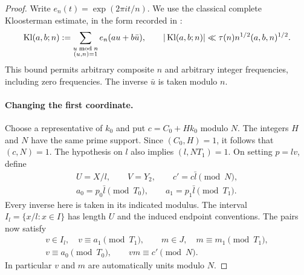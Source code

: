 \begin{proof}
Write $e_n(t)=\exp(2\pi i t/n)$.  We use the classical complete
Kloosterman estimate, in the form recorded in
\cite[Lemma~7.1]{Lichtman2022}:
\begin{equation}
\label{eq:hyperbola-weil}
 \operatorname{Kl}(a,b;n):=\sum_{\substack{u\bmod n\\(u,n)=1}}
                  e_n(au+b\bar u),
 \qquad
 |\operatorname{Kl}(a,b;n)|\ll\tau(n)n^{1/2}(a,b,n)^{1/2}.
\end{equation}
This bound permits arbitrary composite $n$ and arbitrary integer
frequencies, including zero frequencies.  The inverse $\bar u$ is
taken modulo $n$.

\paragraph{Changing the first coordinate.}
Choose a representative of $k_0$ and put $c=C_0+Hk_0$ modulo $N$.
The integers $H$ and $N$ have the same prime support.  Since
$(C_0,H)=1$, it follows that $(c,N)=1$.  The hypothesis on $l$ also
implies $(l,NT_1)=1$.  On setting $p=lv$, define
\[
 \begin{gathered}
 U=X/l,\qquad V=Y_2,\qquad c'=c\bar l\pmod N,\\
 a_0=p_0\bar l\pmod{T_0},\qquad
 a_1=p_1\bar l\pmod{T_1}.
 \end{gathered}
\]
Every inverse here is taken in its indicated modulus.  The interval
$I_l=\{x/l:x\in I\}$ has length $U$ and the induced endpoint
conventions.  The pairs now satisfy
\[
 \begin{gathered}
 v\in I_l,\quad v\equiv a_1\pmod{T_1},\qquad
 m\in J,\quad m\equiv m_1\pmod{T_1},\\
 v\equiv a_0\pmod{T_0},\qquad vm\equiv c'\pmod N.
 \end{gathered}
\]
In particular $v$ and $m$ are automatically units modulo $N$.


\end{proof}
